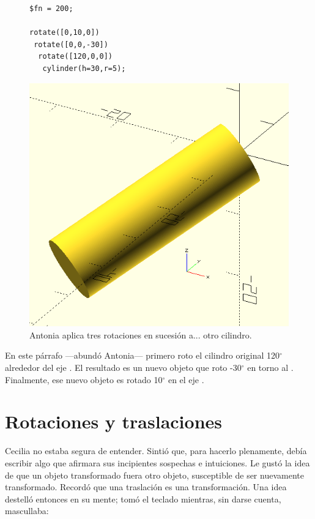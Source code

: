   \begin{figure}[ht]
  \begin{minipage}[]{.5\textwidth}
    \begin{lstlisting}
$fn = 200;

rotate([0,10,0])
 rotate([0,0,-30])
  rotate([120,0,0])
   cylinder(h=30,r=5);
    \end{lstlisting}%
  \end{minipage}\hfill
    \begin{minipage}[]{.5\textwidth}
      \centering
      \includegraphics[width=.6\textwidth]{imagenes/cilindro-rotado-xzy}
    \end{minipage}
    \caption{Antonia aplica tres rotaciones en sucesión a... otro
      cilindro.}
  \label{fig:cilindro-rotado-xzy}
\end{figure}


\guillemotright En este párrafo ---abundó Antonia--- primero roto el
cilindro original
120$^{\circ}$ alrededor del eje . El resultado es un nuevo
objeto que roto
-30$^{\circ}$ en torno al . Finalmente, ese nuevo objeto es
rotado 10$^{\circ}$ en el eje .

  \section{Rotaciones y traslaciones}

  Cecilia no estaba segura de entender. Sintió que, para hacerlo
  plenamente, debía escribir algo que afirmara sus incipientes
  sospechas e intuiciones. Le gustó la idea de que un objeto
  transformado fuera otro objeto, susceptible de ser nuevamente
  transformado. Recordó que una traslación es una transformación.  Una
  idea destelló entonces en su mente; tomó el teclado mientras, sin
  darse cuenta, mascullaba:

